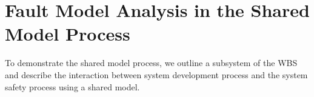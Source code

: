 \section{Fault Model Analysis in the Shared Model Process}
\label{sec:fault_analysis_2}

To demonstrate the shared model process, we outline a subsystem of the WBS and describe the interaction between system development process and the system safety process using a shared model.   